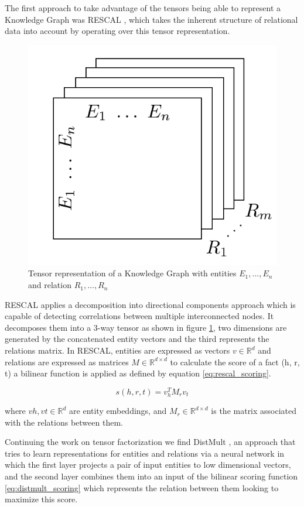 The first approach to take advantage of the tensors being able to represent a Knowledge Graph was RESCAL \cite{}, which takes the inherent structure of relational data into account by operating over this tensor representation.

\begin{figure}[!htp]
    \centering
    \includegraphics[width=.45\textwidth]{fig/embeddings/Rescal.png}
    \caption{Tensor representation of a Knowledge Graph with entities $E_1,...,E_n$ and relation $R_1,...,R_n$}
    \label{fig:emb-rescal}
\end{figure}

RESCAL applies a decomposition into directional components approach which is capable of detecting correlations between multiple interconnected nodes. It decomposes them into a 3-way tensor as shown in figure \ref{fig:emb-rescal}, two dimensions are generated by the concatenated entity vectors and the third represents the relations matrix.
In RESCAL, entities are expressed as vectors $v \in \mathbb{R}^d$ and relations are expressed as matrices $M \in \mathbb{R}^{d \times d}$  to calculate the score of a fact (h, r, t) a bilinear function is applied as defined by equation \ref{eq:rescal_scoring}.

\begin{equation}
    \label{eq:rescal_scoring}
    s(h, r, t) = v^T_h M_r v_t
\end{equation}

where $vh, vt \in \mathbb{R}^d$ are entity embeddings, and $M_r \in \mathbb{R}^{d\times d}$ is the matrix associated with the relations between them.

Continuing the work on tensor factorization we find DistMult \cite{}, an approach that tries to learn representations for entities and relations via a neural network in which the first layer projects a pair of input entities to low dimensional vectors, and the second layer combines them into an input of the bilinear scoring function \ref{eq:distmult_scoring} which represents the relation between them looking to maximize this score.

